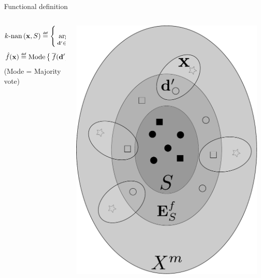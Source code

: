 \documentclass{beamer}
\begin{document}
\begin{frame}{Functional definition}
  \begin{columns}
    \begin{column}{.6\textwidth}
      $$
      k\text{-nan}\left(\mathbf{x}, S\right) \eqdef \Set{\argmin_{\mathbf{d}' \in
      A_E^Y(S)}^k
      \delta(\mathbf{x},\mathbf{d}')}
      $$
      $$\hat{f}(\mathbf{x}) \eqdef \text{Mode}\Set{\albl{\mathbf{d}'} | \mathbf{d}'
      \in k\text{-nan}\left(\mathbf{x}, S\right)}
      $$
      (Mode = Majority vote)
    \end{column}
    \begin{column}{.4\textwidth}
      \begin{center}
        \includegraphics[width=.9\textwidth]{figures/extended_classifier.pdf}
      \end{center}
    \end{column}
  \end{columns}
\end{frame}
\end{document}
